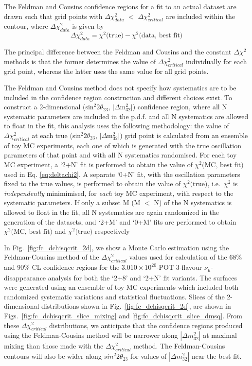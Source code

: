 The Feldman and Cousins confidence regions for a fit to an actual dataset are drawn such that grid points 
with $\Delta\chi^{2}_{data}$ $<$ $\Delta\chi^{2}_{critical}$ are included within the contour, 
where $\Delta\chi^{2}_{data}$ is given by
\begin{equation}
\displaystyle
\Delta \chi^{2}_{data} = \chi^{2} \textrm{(true)} - \chi^{2} \textrm{(data, best fit)}
\label{qe:fccontour}
\end{equation} 

The principal difference between the Feldman and Cousins and the constant $\Delta\chi^{2}$ methods is that the former determines 
the value of $\Delta\chi^{2}_{critical}$ individually for each grid point, whereas the latter uses the same value 
for all grid points.

The Feldman and Cousins method does not  specify how systematics are to be included 
in the confidence region construction and different choices exist. 
To construct a 2-dimensional (sin$^{2}$2$\theta_{23}$, $|\Delta$m$^{2}_{32}|$) confidence region, 
where all N systematic parameters are included in the p.d.f. and all N systematics are allowed to float in the fit,
this analysis uses the following methodology: 
the value of $\Delta\chi^{2}_{critical}$ at each true (sin$^{2}$2$\theta_{23}$, $|\Delta$m$^{2}_{32}|$) grid point 
is calculated from an ensemble of toy MC experiments,
each one of which is generated with the true oscillation parameters of that point and with all N systematics randomised.
For each toy MC experiment,
a `2+N' fit is performed to obtain the value of $\chi^{2} \textrm{(MC, best fit)}$ used in Eq. \ref{eq:deltachi2}.
A separate `0+N' fit, with the oscillation parameters fixed to the true values, is performed to obtain the value of 
$\chi^{2} \textrm{(true)}$, i.e.\ $\chi^{2}$ is {\em independently} minimimised, for {\em each} toy MC experiment, with 
respect to the systematic parameters.
If only a subset M (M $<$ N) of the N systematics is allowed to float in the fit, all N systematics are again randomized 
in the generation of the datasets, and `2+M' and `0+M' fits are
performed to obtain $\chi^{2} \textrm{(MC, best fit)}$ and $\chi^{2} \textrm{(true)}$ respectively

In Fig.\ \ref{fig:fc_dchisqcrit_2d}, we show a Monte Carlo estimation using the Feldman-Cousins method
of the $\Delta\chi^{2}_{critical}$ values
used for calculation of the 68\% and 90\% CL confidence regions
for the $3.010 \times 10^{20}$-POT 3-flavour $\nu_{\mu}$-disappearance analysis
for both the `2+8' and `2+N' fit variants.
The surfaces were generated using an ensemble of toy MC experiments which included both
randomized systematic variations and statistical fluctuations.
Slices of the 2-dimensional distributions shown in Fig.\ \ref{fig:fc_dchisqcrit_2d},
are shown in Figs.\ \ref{fig:fc_dchisqcrit_slice_mixing} and \ref{fig:fc_dchisqcrit_slice_dmsq}.
From these $\Delta\chi^{2}_{critical}$ distributions, we anticipate that the confidence regions produced 
using the Feldman-Cousins method will be narrower along $|\Delta{m^{2}_{32}}|$ at maximal mixing than 
those made with the $\Delta\chi^{2}_{critical}$ method. The Feldman-Cousins contours will also be wider 
along $sin^{2}{2\theta_{23}}$ for values of $|\Delta{m^{2}_{32}}|$ near the best fit.

